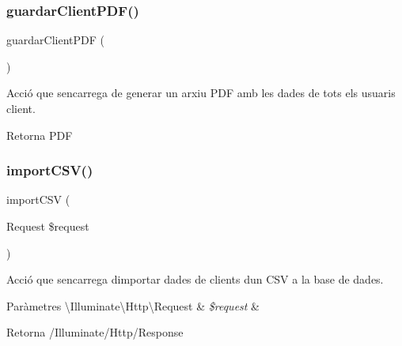 \subsubsection{\texorpdfstring{guardar\+Client\+P\+D\+F()}{guardarClientPDF()}}
{\footnotesize\ttfamily guardar\+Client\+P\+DF (\begin{DoxyParamCaption}{ }\end{DoxyParamCaption})}

Acció que s\textquotesingle{}encarrega de generar un arxiu P\+DF amb les dades de tots els usuaris client.

\begin{DoxyReturn}{Retorna}
P\+DF 
\end{DoxyReturn}
\mbox{\label{class_app_1_1_http_1_1_controllers_1_1_clients_controller_ac4558929a5961fdc5574d0cd847561a6}} 
\subsubsection{\texorpdfstring{import\+C\+S\+V()}{importCSV()}}
{\footnotesize\ttfamily import\+C\+SV (\begin{DoxyParamCaption}\item[{Request}]{\$request }\end{DoxyParamCaption})}

Acció que s\textquotesingle{}encarrega d\textquotesingle{}importar dades de clients d\textquotesingle{}un C\+SV a la base de dades.


\begin{DoxyParams}[1]{Paràmetres}
\textbackslash{}\+Illuminate\textbackslash{}\+Http\textbackslash{}\+Request & {\em \$request} & \\
\hline
\end{DoxyParams}
\begin{DoxyReturn}{Retorna}
/\+Illuminate/\+Http/\+Response 
\end{DoxyReturn}
\mbox{\label{class_app_1_1_http_1_1_controllers_1_1_clients_controller_a149eb92716c1084a935e04a8d95f7347}} 
